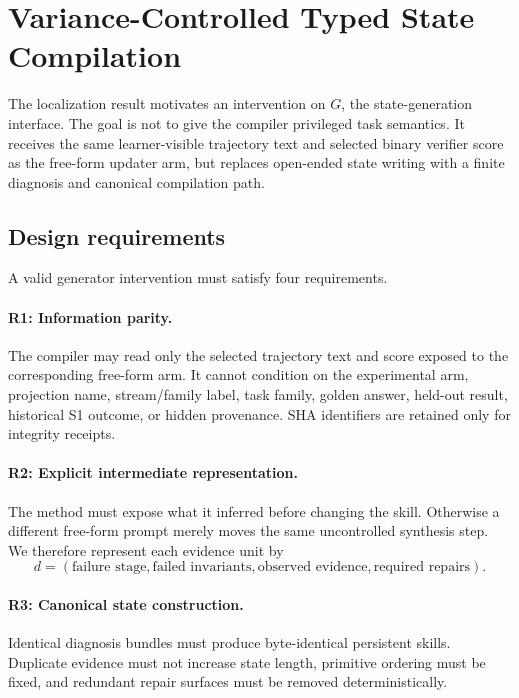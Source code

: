 \section{Variance-Controlled Typed State Compilation}
\label{sec:compiler}

The localization result motivates an intervention on $G$, the state-generation interface. The goal is not to give the compiler privileged task semantics. It receives the same learner-visible trajectory text and selected binary verifier score as the free-form updater arm, but replaces open-ended state writing with a finite diagnosis and canonical compilation path.

\subsection{Design requirements}
A valid generator intervention must satisfy four requirements.

\paragraph{R1: Information parity.}
The compiler may read only the selected trajectory text and score exposed to the corresponding free-form arm. It cannot condition on the experimental arm, projection name, stream/family label, task family, golden answer, held-out result, historical S1 outcome, or hidden provenance. SHA identifiers are retained only for integrity receipts.

\paragraph{R2: Explicit intermediate representation.}
The method must expose what it inferred before changing the skill. Otherwise a different free-form prompt merely moves the same uncontrolled synthesis step. We therefore represent each evidence unit by
\begin{equation}
d=(\text{failure stage},\text{failed invariants},\text{observed evidence},\text{required repairs}).
\end{equation}

\paragraph{R3: Canonical state construction.}
Identical diagnosis bundles must produce byte-identical persistent skills. Duplicate evidence must not increase state length, primitive ordering must be fixed, and redundant repair surfaces must be removed deterministically.

